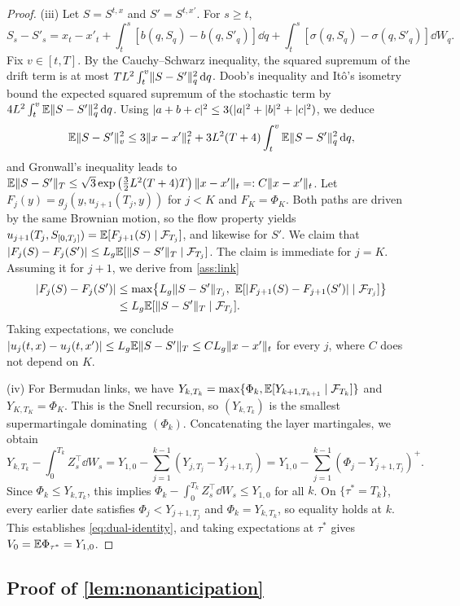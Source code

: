 \begin{proof}
(iii) Let $S=S^{t,x}$ and $S'=S^{t,x'}$. For $s\ge t$,
\[
S_s-S'_s=x_t-x'_t+\int_t^s[b(q,S_q)-b(q,S'_q)]\dd q+\int_t^s[\sigma(q,S_q)-\sigma(q,S'_q)]\dd W_q .
\]
Fix $v\in[t,T]$. By the Cauchy--Schwarz inequality, the squared supremum of the drift term is at most $TL^2\int_t^v\lVert S-S'\rVert_q^2\,\mathrm{d} q$. Doob's inequality and It\^o's isometry bound the expected squared supremum of the stochastic term by $4L^2\int_t^v\mathbb{E}\lVert S-S'\rVert_q^2\,\mathrm{d} q$. Using $\lvert a+b+c\rvert^2\le3(\lvert a\rvert^2+\lvert b\rvert^2+\lvert c\rvert^2)$, we deduce
\[
\mathbb{E}\lVert S-S'\rVert_v^2\le3\lVert x-x'\rVert_t^2+3L^2(T+4)\int_t^v\mathbb{E}\lVert S-S'\rVert_q^2\,\mathrm{d} q ,
\]
and Gronwall's inequality leads to $\mathbb{E}\lVert S-S'\rVert_T\le\sqrt3\exp\left(\tfrac32L^2(T+4)T\right)\lVert x-x'\rVert_t=:C\lVert x-x'\rVert_t$. Let $F_j(y)=g_j(y,u_{j+1}(T_j,y))$ for $j<K$ and $F_K=\Phi_K$. Both paths are driven by the same Brownian motion, so the flow property yields $u_{j+1}(T_j,S_{[0,T_j]})=\mathbb{E}[F_{j+1}(S)\mid\mathcal{F}_{T_j}]$, and likewise for $S'$. We claim that $\lvert F_j(S)-F_j(S')\rvert\le L_g\mathbb{E}[\lVert S-S'\rVert_T\mid\mathcal{F}_{T_j}]$. The claim is immediate for $j=K$. Assuming it for $j+1$, we derive from \cref{ass:link}
\[
\begin{aligned}\abs{F_j(S)-F_j(S')}&\le\max\bigl\{L_g\norm{S-S'}_{T_j},\ \E[\abs{F_{j+1}(S)-F_{j+1}(S')}\mid\cF_{T_j}]\bigr\}\\&\le L_g\E[\norm{S-S'}_T\mid\cF_{T_j}] .\end{aligned}
\]
Taking expectations, we conclude $\lvert u_j(t,x)-u_j(t,x')\rvert\le L_g\mathbb{E}\lVert S-S'\rVert_T\le CL_g\lVert x-x'\rVert_t$ for every $j$, where $C$ does not depend on $K$.

(iv) For Bermudan links, we have $Y_{k,T_k}=\max\{\Phi_k,\mathbb{E}[Y_{k+1,T_{k+1}}\mid\mathcal{F}_{T_k}]\}$ and $Y_{K,T_K}=\Phi_K$. This is the Snell recursion, so $(Y_{k,T_k})$ is the smallest supermartingale dominating $(\Phi_k)$. Concatenating the layer martingales, we obtain
\[
Y_{k,T_k}-\int_0^{T_k}Z_s^\top\dd W_s=Y_{1,0}-\sum_{j=1}^{k-1}(Y_{j,T_j}-Y_{j+1,T_j})=Y_{1,0}-\sum_{j=1}^{k-1}\left(\Phi_j-Y_{j+1,T_j}\right)^+ .
\]
Since $\Phi_k\le Y_{k,T_k}$, this implies $\Phi_k-\int_0^{T_k}Z_s^\top\dd W_s\le Y_{1,0}$ for all $k$. On $\{\tau^*=T_k\}$, every earlier date satisfies $\Phi_j<Y_{j+1,T_j}$ and $\Phi_k=Y_{k,T_k}$, so equality holds at $k$. This establishes \eqref{eq:dual-identity}, and taking expectations at $\tau^*$ gives $V_0=\mathbb{E}\Phi_{\tau^*}=Y_{1,0}$.
\end{proof}

\subsection{Proof of \texorpdfstring{\cref{lem:nonanticipation}}{Lemma 3}}\label{app:nonanticipation}

